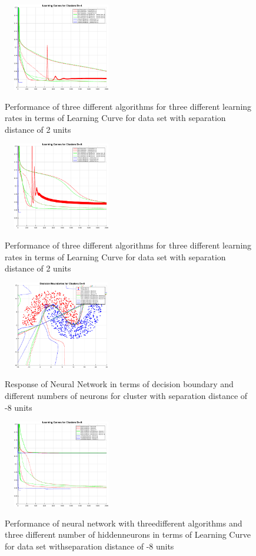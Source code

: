 \documentclass[conference]{IEEEtran}
\begin{document}
\begin{figure}[h!]
\centering
{\includegraphics[width=2in,height=1.5in,clip,keepaspectratio]{Exp1_LCn4.eps} }\\
\caption{Performance of three different algorithms for three different learning rates in terms of Learning Curve for data set with separation distance of 2 units}
\end{figure}
\begin{figure}[h!]
\centering
{\includegraphics[width=2in,height=1.5in,clip,keepaspectratio]{Exp1_LCn8.eps} }\\
\caption{Performance of three different algorithms for three different learning rates in terms of Learning Curve for data set with separation distance of 2 units}
\end{figure}
\begin{figure}[h!]
\centering
{\includegraphics[width=2in,height=1.5in,clip,keepaspectratio]{Exp2_DBn8.eps} }\\
\caption{Response of Neural Network in terms of decision boundary  and different numbers of neurons for cluster with separation distance of -8 units}
\end{figure}
\begin{figure}[h!]
\centering
{\includegraphics[width=2in,height=1.5in,clip,keepaspectratio]{Exp2_LCn8.eps} }\\
\caption{Performance of neural network with threedifferent algorithms and three different number of hiddenneurons in terms of Learning Curve for data set withseparation distance of -8 units }
\end{figure}
\end{document}
